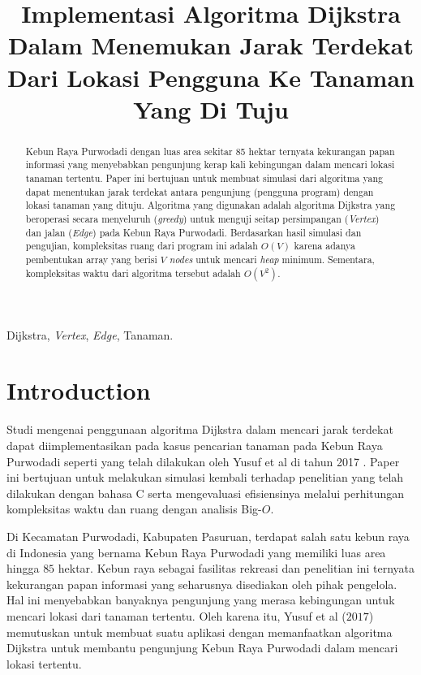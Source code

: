 \documentclass[conference]{IEEEtran}
\title{Implementasi Algoritma Dijkstra Dalam
Menemukan Jarak Terdekat Dari Lokasi Pengguna
Ke Tanaman Yang Di Tuju}
\author{\IEEEauthorblockN{Fitra Nurindra}
\IEEEauthorblockA{\textit{School of Electrical Engineering and Informatics}\\
\textit{Institut Teknologi Bandung}\\
Bandung, Indonesia\\
Email: 13220011@std.stei.itb.ac.id}
}
\begin{document}
\maketitle

\begin{abstract}
    Kebun Raya Purwodadi dengan luas area sekitar 85
    hektar ternyata kekurangan papan informasi yang menyebabkan
    pengunjung kerap kali kebingungan dalam mencari lokasi tanaman
    tertentu. Paper ini bertujuan untuk membuat simulasi
    dari algoritma yang dapat menentukan jarak terdekat antara
    pengunjung (pengguna program) dengan lokasi tanaman yang
    dituju. Algoritma yang digunakan adalah algoritma Dijkstra
    yang beroperasi secara menyeluruh (\textit{greedy}) untuk menguji
    seitap persimpangan (\textit{Vertex}) dan jalan (\textit{Edge}) pada Kebun
    Raya Purwodadi. Berdasarkan hasil simulasi dan pengujian,
    kompleksitas ruang dari program ini adalah $O(V)$ karena adanya
    pembentukan array yang berisi $V$ \textit{nodes} untuk mencari \textit{heap}
    minimum. Sementara, kompleksitas waktu dari algoritma tersebut
    adalah $O(V^2)$.
\end{abstract}

\begin{IEEEkeywords}
    Dijkstra, \textit{Vertex}, \textit{Edge}, Tanaman.
\end{IEEEkeywords}

\section{Introduction}
    Studi mengenai penggunaan algoritma Dijkstra dalam mencari
    jarak terdekat dapat diimplementasikan pada kasus pencarian
    tanaman pada Kebun Raya Purwodadi seperti yang telah
    dilakukan oleh Yusuf et al di tahun 2017 \cite{yusuf2017implementasi}. Paper ini bertujuan
    untuk melakukan simulasi kembali terhadap penelitian
    yang telah dilakukan dengan bahasa C serta mengevaluasi
    efisiensinya melalui perhitungan kompleksitas waktu dan ruang
    dengan analisis Big-$O$.
    
    Di Kecamatan Purwodadi, Kabupaten Pasuruan, terdapat
    salah satu kebun raya di Indonesia yang bernama Kebun
    Raya Purwodadi yang memiliki luas area hingga $85$ hektar.
    Kebun raya sebagai fasilitas rekreasi dan penelitian ini ternyata
    kekurangan papan informasi yang seharusnya disediakan oleh
    pihak pengelola. Hal ini menyebabkan banyaknya pengunjung
    yang merasa kebingungan untuk mencari lokasi dari tanaman
    tertentu. Oleh karena itu, Yusuf et al ($2017$) memutuskan
    untuk membuat suatu aplikasi dengan memanfaatkan algoritma
    Dijkstra untuk membantu pengunjung Kebun Raya Purwodadi
    dalam mencari lokasi tertentu.
\end{document}
